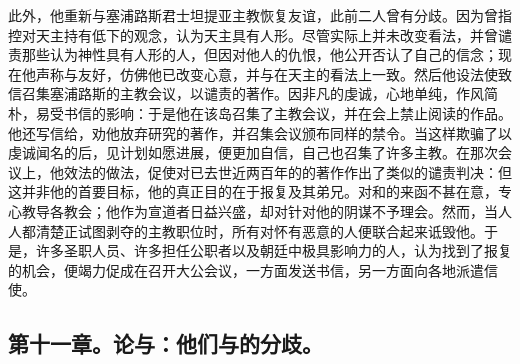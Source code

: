 此外，他重新与塞浦路斯君士坦提亚主教恢复友谊，此前二人曾有分歧。因为曾指控对天主持有低下的观念，认为天主具有人形。尽管实际上并未改变看法，并曾谴责那些认为神性具有人形的人，但因对他人的仇恨，他公开否认了自己的信念；现在他声称与友好，仿佛他已改变心意，并与在天主的看法上一致。然后他设法使致信召集塞浦路斯的主教会议，以谴责的著作。因非凡的虔诚，心地单纯，作风简朴，易受书信的影响：于是他在该岛召集了主教会议，并在会上禁止阅读的作品。他还写信给，劝他放弃研究的著作，并召集会议颁布同样的禁令。当这样欺骗了以虔诚闻名的后，见计划如愿进展，便更加自信，自己也召集了许多主教。在那次会议上，他效法的做法，促使对已去世近两百年的的著作作出了类似的谴责判决：但这并非他的首要目标，他的真正目的在于报复及其弟兄。对和的来函不甚在意，专心教导各教会；他作为宣道者日益兴盛，却对针对他的阴谋不予理会。然而，当人人都清楚正试图剥夺的主教职位时，所有对怀有恶意的人便联合起来诋毁他。于是，许多圣职人员、许多担任公职者以及朝廷中极具影响力的人，认为找到了报复的机会，便竭力促成在召开大公会议，一方面发送书信，另一方面向各地派遣信使。\newline{}\par


\subsection{第十一章。论与：他们与的分歧。}

